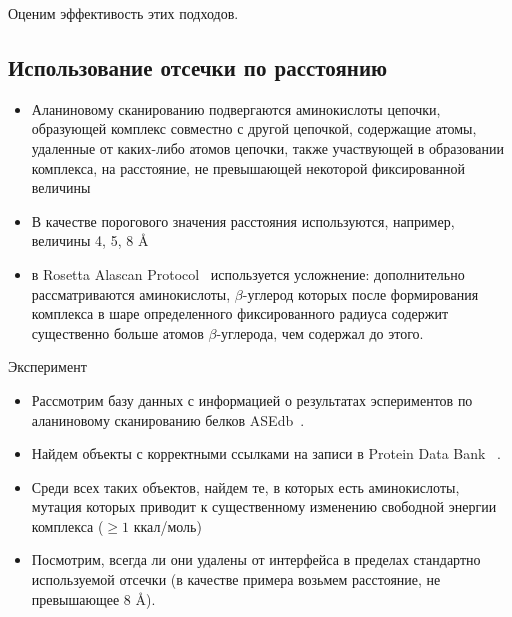 Оценим эффективость этих подходов.

\subsection{Использование отсечки по расстоянию}

\begin{itemize}
\item Аланиновому сканированию подвергаются аминокислоты цепочки, образующей комплекс совместно с другой цепочкой, содержащие атомы, удаленные от каких-либо атомов цепочки, также участвующей в образовании комплекса, на расстояние, не превышающей некоторой фиксированной величины

\item В качестве порогового значения расстояния используются, например, величины 4, 5, 8 \AA{}

\item в Rosetta Alascan Protocol~\cite{kortemme2004} используется усложнение: дополнительно рассматриваются аминокислоты, $\beta$-углерод которых после формирования комплекса в шаре определенного фиксированного радиуса содержит существенно больше атомов $\beta$-углерода, чем содержал до этого.
\end{itemize}
\newpage
Эксперимент
\begin{itemize}
\item Рассмотрим базу данных с информацией о результатах эспериментов по аланиновому сканированию белков ASEdb~\cite{asedb2001}.
\item Найдем объекты с корректными ссылками на записи в Protein Data Bank ~\cite{rcsb}.
\item Среди всех таких объектов, найдем те, в которых есть аминокислоты, мутация которых приводит к существенному изменению свободной энергии комплекса ($\geq 1$ ккал/моль)
\item Посмотрим, всегда ли они удалены от интерфейса в пределах стандартно используемой отсечки (в качестве примера возьмем расстояние, не превышающее 8 \AA{}).
\end{itemize}


